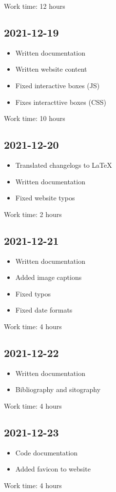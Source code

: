 \documentclass{article}
\begin{document}
Work time: 12 hours

\subsection*{2021-12-19}

\begin{itemize}
    \item Written documentation
    \item Written website content
    \item Fixed interactive boxes (JS)
    \item Fixes interacttive boxes (CSS)
\end{itemize}

Work time: 10 hours

\subsection*{2021-12-20}

\begin{itemize}
    \item Translated changelogs to LaTeX
    \item Written documentation
    \item Fixed website typos
\end{itemize}

Work time: 2 hours

\subsection*{2021-12-21}

\begin{itemize}
    \item Written documentation
    \item Added image captions
    \item Fixed typos
    \item Fixed date formats
\end{itemize}

Work time: 4 hours

\subsection*{2021-12-22}

\begin{itemize}
    \item Written documentation
    \item Bibliography and sitography
\end{itemize}

Work time: 4 hours

\subsection*{2021-12-23}

\begin{itemize}
    \item Code documentation
    \item Added favicon to website
\end{itemize}

Work time: 4 hours
\end{document}

